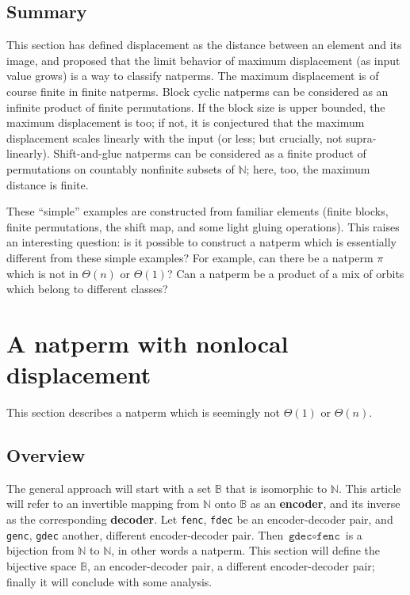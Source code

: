 \documentclass[12pt,reqno]{article}
\begin{document}
\subsection{Summary}

This section has defined displacement as the distance between an element and its image, and proposed that the limit behavior of maximum displacement (as input value grows) is a way to classify natperms. The maximum displacement is of course finite in finite natperms. Block cyclic natperms can be considered as an infinite product of finite permutations. If the block size is upper bounded, the maximum displacement is too; if not, it is conjectured that the maximum displacement scales linearly with the input (or less; but crucially, not supra-linearly). Shift-and-glue natperms can be considered as a finite product of permutations on countably nonfinite subsets of $\mathbb{N}$; here, too, the maximum distance is finite.

These ``simple'' examples are constructed from familiar elements (finite blocks, finite permutations, the shift map, and some light gluing operations). This raises an interesting question: is it possible to construct a natperm which is essentially different from these simple examples? For example, can there be a natperm $\pi$ which is not in $\Theta(n)$ or $\Theta(1)$? Can a natperm be a product of a mix of orbits which belong to different classes?

\section{A natperm with nonlocal displacement}

This section describes a natperm which is seemingly not $\Theta(1)$ or $\Theta(n)$.

\subsection{Overview}

The general approach will start with a set $\mathbb{B}$ that is isomorphic to $\mathbb{N}$. This article will refer to an invertible mapping from $\mathbb{N}$ onto $\mathbb{B}$ as an \textbf{encoder}, and its inverse as the corresponding \textbf{decoder}. Let \texttt{fenc}, \texttt{fdec} be an encoder-decoder pair, and \texttt{genc}, \texttt{gdec} another, different encoder-decoder pair. Then $\texttt{gdec} \circ \texttt{fenc}$ is a bijection from $\mathbb{N}$ to $\mathbb{N}$, in other words a natperm. This section will define the bijective space $\mathbb{B}$, an encoder-decoder pair, a different encoder-decoder pair; finally it will conclude with some analysis.
\end{document}

